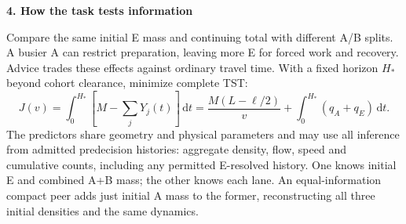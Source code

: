 \documentclass[10pt,a4paper]{article}
\newcommand{\dd}{\,\mathrm d}
\newcommand{\head}[1]{\par\vspace{4pt}\noindent\textbf{#1}\par\nobreak\vspace{1pt}}
\begin{document}
\head{4. How the task tests information}
Compare the same initial E mass and continuing total with different A/B
splits. A busier A can restrict preparation, leaving more E for forced work
and recovery. Advice trades these effects against ordinary travel time.
With a fixed horizon $H_*$ beyond cohort clearance, minimize complete TST:
\begin{equation}
 J(v)=\int_0^{H_*}\!\left[M-\sum_jY_j(t)\right]\dd t
 =\frac{M(L-\ell/2)}v+\int_0^{H_*}(q_A+q_E)\dd t.
 \label{eq:objective}
\end{equation}
The predictors share geometry and physical parameters and may use all
inference from admitted predecision histories: aggregate density, flow,
speed and cumulative counts, including any permitted E-resolved history.
One knows initial E and combined A+B mass; the other knows each lane.
An equal-information compact peer adds just initial A mass to the former,
reconstructing all three initial densities and the same dynamics.
\end{document}

